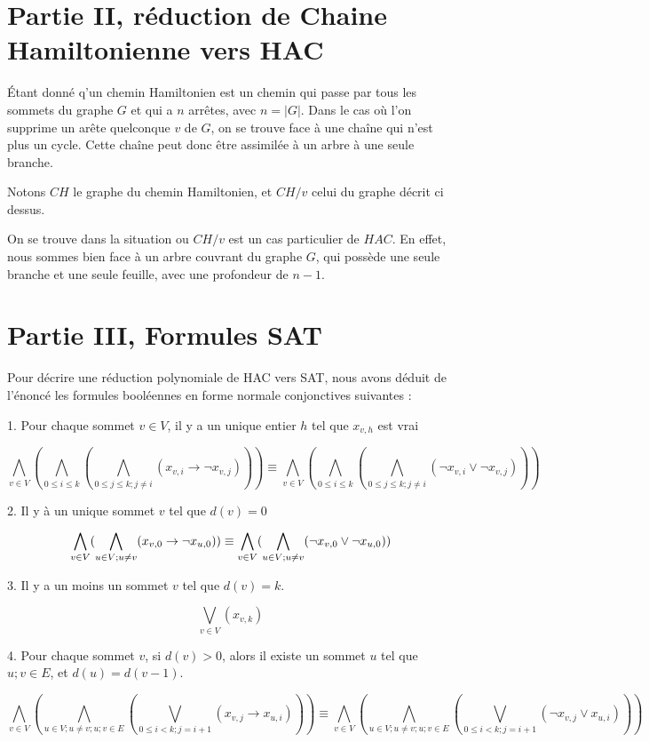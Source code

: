 \documentclass{article}
\begin{document}
\section{Partie II, réduction de Chaine Hamiltonienne vers HAC}

Étant donné q'un chemin Hamiltonien est un chemin qui passe par tous les sommets du graphe $G$ et qui a $n$ arrêtes, avec $n = |G|$. Dans le cas où l'on supprime un arête quelconque $v$ de $G$, on se trouve face à une chaîne qui n'est plus un cycle.
Cette chaîne peut donc être assimilée à un arbre à une seule branche.

Notons $CH$ le graphe du chemin Hamiltonien, et $CH / {v}$ celui du graphe décrit ci dessus.

\smallbreak

On se trouve dans la situation ou $CH / {v}$ est un cas particulier de $HAC$. En effet, nous sommes bien face à un arbre couvrant du graphe $G$, qui possède une seule branche et une seule feuille, avec une profondeur de $n-1$.


\section{Partie III, Formules SAT}

Pour décrire une réduction polynomiale de HAC vers SAT, nous avons déduit de l'énoncé les formules booléennes en forme normale conjonctives suivantes : 

\bigbreak

1. Pour chaque sommet $v \in V$, il y a un unique entier $h$ tel que $x_{v,h}$ est vrai

$$ \bigwedge\limits_{v \in V} (\bigwedge\limits_{0 \leq i \leq k} (\bigwedge\limits_{0 \leq j \leq k; j \neq i}(x_{v,i} \rightarrow \neg x_{v,j}))) \equiv \bigwedge\limits_{v \in V} (\bigwedge\limits_{0 \leq i \leq k} (\bigwedge\limits_{0 \leq j \leq k; j \neq i}(\neg x_{v,i} \lor \neg x_{v,j}))) $$


2. Il y à un unique sommet $ v $ tel que $d(v) = 0$

$$ \bigwedge\limits_{v \in V} (\bigwedge\limits_{u \in V;\\ u \neq v} (x_{v,0} \rightarrow \neg x_{u,0})) \equiv \bigwedge\limits_{v \in V} (\bigwedge\limits_{u \in V;\\ u \neq v} (\neg x_{v,0} \lor \neg x_{u,0})) $$

3. Il y a un moins un sommet $v$ tel que $d(v)=k$.

$$ \bigvee\limits_{v\in V}(x_{v,k}) $$


4. Pour chaque sommet $v$, si $d(v) > 0$, alors il existe un sommet $u$ tel que ${u;v}\in E$, et $d(u)=d(v-1)$.

$$ \bigwedge\limits_{v \in V} (\bigwedge\limits_{u \in V; u \neq v; {u;v}\in E} (\bigvee\limits_{0 \leq i < k; j = i+1}(x_{v,j} \rightarrow x_{u,i}))) \equiv \bigwedge\limits_{v \in V} (\bigwedge\limits_{u \in V; u \neq v; {u;v}\in E} (\bigvee\limits_{0 \leq i < k; j = i+1}(\neg x_{v,j} \lor x_{u,i}))) $$
\end{document}
